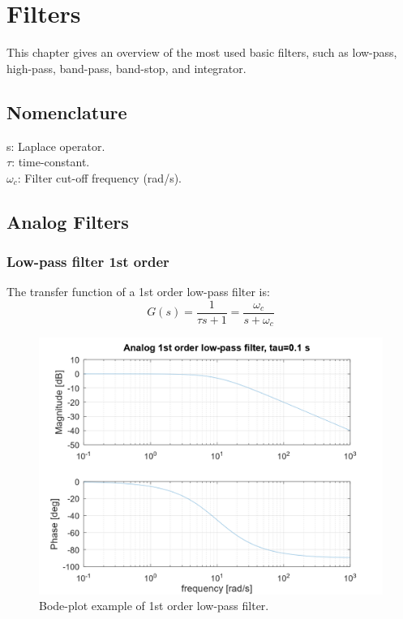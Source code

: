 \documentclass[]{book}
\begin{document}
\hypertarget{filters}{%
\chapter{Filters}\label{filters}}

This chapter gives an overview of the most used basic filters, such as low-pass, high-pass, band-pass, band-stop, and integrator.

\hypertarget{nomenclature}{%
\section{Nomenclature}\label{nomenclature}}

s: Laplace operator.\\
\(\tau\): time-constant.\\
\(\omega_c\): Filter cut-off frequency (rad/s).

\hypertarget{analog-filters}{%
\section{Analog Filters}\label{analog-filters}}

\hypertarget{low-pass-filter-1st-order}{%
\subsection{Low-pass filter 1st order}\label{low-pass-filter-1st-order}}

The transfer function of a 1st order low-pass filter is:
\[
G(s) =  \frac{1}{\tau s + 1} = \frac{\omega_c}{s + \omega_c}
\label{eq:lpf1}
\]

\begin{figure}
\includegraphics[width=0.8\linewidth]{images/filters/lpf_1st} \caption{Bode-plot example of 1st order low-pass filter.}\label{fig:unnamed-chunk-1}
\end{figure}
\end{document}
